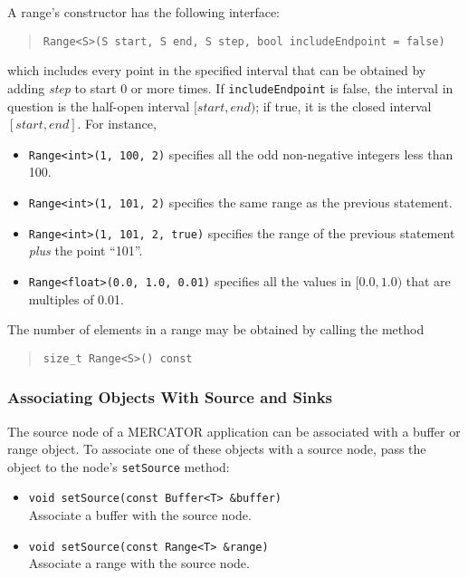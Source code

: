 \documentclass[11pt]{article}
\begin{document}
A range's constructor has the following interface:
\begin{quote}
\texttt{Range<S>(S start, S end, S step, bool includeEndpoint = false)}
\end{quote}
which includes every point in the specified interval that can be 
obtained by adding \textit{step} to start 0 or more times.
If \texttt{includeEndpoint} is false, the interval in question is
the half-open interval $[\textit{start}, \textit{end})$; if true,
it is the closed interval $[\textit{start}, \textit{end}]$.
For instance,
\begin{itemize}
\item \texttt{Range<int>(1, 100, 2)} specifies all the odd non-negative
      integers less than 100.

\item \texttt{Range<int>(1, 101, 2)} specifies the same range as
      the previous statement.

\item \texttt{Range<int>(1, 101, 2, true)} specifies the range of
      the previous statement \emph{plus} the point ``101''.

\item \texttt{Range<float>(0.0, 1.0, 0.01)} specifies all the values
      in $[0.0, 1.0)$ that are multiples of 0.01.
\end{itemize}

The number of elements in a range may be obtained by calling the
method
\begin{quote}
\texttt{size_t Range<S>() const}
\end{quote}
 
\subsubsection{Associating Objects With Source and Sinks}

The source node of a MERCATOR application can be associated with a
buffer or range object.  To associate one of these objects with a
source node, pass the object to the node's \texttt{setSource} method:
\begin{itemize}

\item \texttt{void setSource(const Buffer<T> \&buffer)} \\
  Associate a buffer with the source node.

\item \texttt{void setSource(const Range<T> \&range)} \\
  Associate a range with the source node.

\end{itemize}
\end{document}
